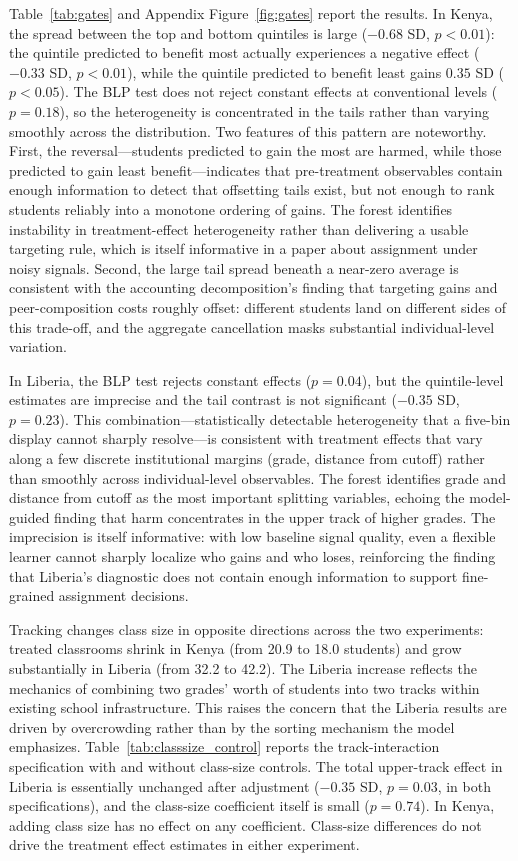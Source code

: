 \documentclass[11pt]{article}
\begin{document}
Table~\ref{tab:gates} and Appendix Figure~\ref{fig:gates} report the results. In Kenya, the spread between the top and bottom quintiles is large ($-0.68$ SD, $p < 0.01$): the quintile predicted to benefit most actually experiences a negative effect ($-0.33$ SD, $p < 0.01$), while the quintile predicted to benefit least gains $0.35$ SD ($p < 0.05$). The BLP test does not reject constant effects at conventional levels ($p = 0.18$), so the heterogeneity is concentrated in the tails rather than varying smoothly across the distribution. Two features of this pattern are noteworthy. First, the reversal---students predicted to gain the most are harmed, while those predicted to gain least benefit---indicates that pre-treatment observables contain enough information to detect that offsetting tails exist, but not enough to rank students reliably into a monotone ordering of gains. The forest identifies instability in treatment-effect heterogeneity rather than delivering a usable targeting rule, which is itself informative in a paper about assignment under noisy signals. Second, the large tail spread beneath a near-zero average is consistent with the accounting decomposition's finding that targeting gains and peer-composition costs roughly offset: different students land on different sides of this trade-off, and the aggregate cancellation masks substantial individual-level variation.

In Liberia, the BLP test rejects constant effects ($p=0.04$), but the quintile-level estimates are imprecise and the tail contrast is not significant ($-0.35$ SD, $p = 0.23$). This combination---statistically detectable heterogeneity that a five-bin display cannot sharply resolve---is consistent with treatment effects that vary along a few discrete institutional margins (grade, distance from cutoff) rather than smoothly across individual-level observables. The forest identifies grade and distance from cutoff as the most important splitting variables, echoing the model-guided finding that harm concentrates in the upper track of higher grades. The imprecision is itself informative: with low baseline signal quality, even a flexible learner cannot sharply localize who gains and who loses, reinforcing the finding that Liberia's diagnostic does not contain enough information to support fine-grained assignment decisions.

Tracking changes class size in opposite directions across the two experiments: treated classrooms shrink in Kenya (from 20.9 to 18.0 students) and grow substantially in Liberia (from 32.2 to 42.2). The Liberia increase reflects the mechanics of combining two grades' worth of students into two tracks within existing school infrastructure. This raises the concern that the Liberia results are driven by overcrowding rather than by the sorting mechanism the model emphasizes. Table~\ref{tab:classsize_control} reports the track-interaction specification with and without class-size controls. The total upper-track effect in Liberia is essentially unchanged after adjustment ($-0.35$ SD, $p = 0.03$, in both specifications), and the class-size coefficient itself is small ($p = 0.74$). In Kenya, adding class size has no effect on any coefficient. Class-size differences do not drive the treatment effect estimates in either experiment.
\end{document}
